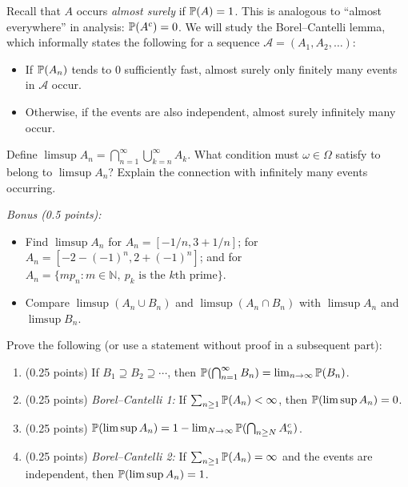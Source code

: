 \documentclass[a4paper]{report}
\begin{document}
\begin{problem}
Recall that $A$ occurs \emph{almost surely} if $\P(A)=1$. This is analogous to ``almost everywhere'' in analysis: $\P(A^c)=0$. We will study the Borel--Cantelli lemma, which informally states the following for a sequence $\mathcal A=(A_1,A_2,\ldots)$:
\begin{itemize}
\item If $\P(A_n)$ tends to 0 sufficiently fast, almost surely only finitely many events in $\mathcal A$ occur.
\item Otherwise, if the events are also independent, almost surely infinitely many occur.
\end{itemize}
Define $\displaystyle\limsup A_n=\bigcap_{n=1}^\infty\bigcup_{k=n}^\infty A_k$. What condition must $\omega\in\Omega$ satisfy to belong to $\limsup A_n$? Explain the connection with infinitely many events occurring.

\emph{Bonus (0.5 points):}
\begin{itemize}
\item Find $\limsup A_n$ for $A_n=[-1/n,3+1/n]$; for $A_n=[-2-(-1)^n,2+(-1)^n]$; and for $A_n=\{mp_n:m\in\mathbb N,\ p_k\text{ is the }k\text{th prime}\}$.
\item Compare $\limsup(A_n\cup B_n)$ and $\limsup(A_n\cap B_n)$ with $\limsup A_n$ and $\limsup B_n$.
\end{itemize}
Prove the following (or use a statement without proof in a subsequent part):
\begin{enumerate}
\item (0.25 points) If $B_1\supseteq B_2\supseteq\cdots$, then $\P(\bigcap_{n=1}^\infty B_n)=\lim_{n\to\infty}\P(B_n)$.
\item (0.25 points) \emph{Borel--Cantelli 1:} If $\sum_{n\geq1}\P(A_n)<\infty$, then $\P(\limsup A_n)=0$.
\item (0.25 points) $\P(\limsup A_n)=1-\lim_{N\to\infty}\P(\bigcap_{n\geq N}A_n^c)$.
\item (0.25 points) \emph{Borel--Cantelli 2:} If $\sum_{n\geq1}\P(A_n)=\infty$ and the events are independent, then $\P(\limsup A_n)=1$.
\end{enumerate}
\end{problem}
\end{document}
